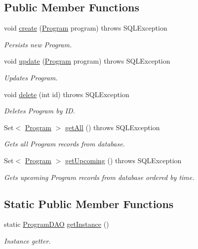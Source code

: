 \subsection*{Public Member Functions}
\begin{DoxyCompactItemize}
\item 
void \hyperlink{classdatabase_1_1ProgramDAO_a4b21d41b6f65f50f0d4bbea82b08b3a4}{create} (\hyperlink{classmodel_1_1Program}{Program} program)  throws S\-Q\-L\-Exception 
\begin{DoxyCompactList}\small\item\em Persists new Program. \end{DoxyCompactList}\item 
void \hyperlink{classdatabase_1_1ProgramDAO_a04a0d6682efd0b8de1e4f5a2fb9eff1f}{update} (\hyperlink{classmodel_1_1Program}{Program} program)  throws S\-Q\-L\-Exception 
\begin{DoxyCompactList}\small\item\em Updates Program. \end{DoxyCompactList}\item 
void \hyperlink{classdatabase_1_1ProgramDAO_ad8b438f7c667c619c45fc62c6536b0ec}{delete} (int id)  throws S\-Q\-L\-Exception 
\begin{DoxyCompactList}\small\item\em Deletes Program by I\-D. \end{DoxyCompactList}\item 
Set$<$ \hyperlink{classmodel_1_1Program}{Program} $>$ \hyperlink{classdatabase_1_1ProgramDAO_af130284e455d83524787ab2671eb0325}{get\-All} ()  throws S\-Q\-L\-Exception 
\begin{DoxyCompactList}\small\item\em Gets all Program records from database. \end{DoxyCompactList}\item 
Set$<$ \hyperlink{classmodel_1_1Program}{Program} $>$ \hyperlink{classdatabase_1_1ProgramDAO_a4e35b888111c328029cf2815b95a36a5}{get\-Upcoming} ()  throws S\-Q\-L\-Exception 
\begin{DoxyCompactList}\small\item\em Gets upcoming Program records from database ordered by time. \end{DoxyCompactList}\end{DoxyCompactItemize}
\subsection*{Static Public Member Functions}
\begin{DoxyCompactItemize}
\item 
static \hyperlink{classdatabase_1_1ProgramDAO}{Program\-D\-A\-O} \hyperlink{classdatabase_1_1ProgramDAO_a9b6c7981aee76613fa22242bee6bcfed}{get\-Instance} ()
\begin{DoxyCompactList}\small\item\em Instance getter. \end{DoxyCompactList}\end{DoxyCompactItemize}
